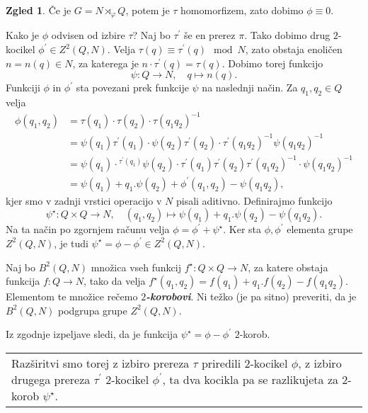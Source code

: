 \documentclass[11pt]{book}
\def\definicija{\color{rdeca}\bf\em}
\def\vprasanje{\color{oranzna}}
\theoremstyle{definition}
\theoremstyle{zgled}
\newtheorem*{zgled}{Zgled}
\theoremstyle{odprtproblem}
\theoremstyle{domacanaloga}
\theoremstyle{izrek}
\newenvironment{povzetek}
    {
\smallskip
\begin{center}
\color{svetlosiva}
\begin{tabular}{|p{0.7\textwidth}}
    }
    {
\end{tabular}
\end{center}
\smallskip
    }
\begin{document}
\begin{zgled}
Če je $G = N \rtimes_\varphi Q$, potem je $\tau$ homomorfizem, zato dobimo $\phi \equiv 0$.
\end{zgled}

{\vprasanje Kako je $\phi$ odvisen od izbire $\tau$?} Naj bo $\tau^\prime$ še en prerez $\pi$. Tako dobimo drug $2$-kocikel $\phi^\prime \in Z^2(Q,N)$. Velja $\tau(q) \equiv \tau^\prime(q) \mod{N}$, zato obstaja enoličen $n = n(q) \in N$, za katerega je $n \cdot \tau^\prime(q) = \tau(q)$. Dobimo torej funkcijo 
\[
\psi \colon Q \to N, \quad q \mapsto n(q).
\]
Funkciji $\phi$ in $\phi^\prime$ sta povezani prek funkcije $\psi$ na naslednji način. Za $q_1, q_2 \in Q$ velja
\begin{align*}
\phi(q_1, q_2) &= \tau(q_1) \cdot \tau(q_2) \cdot \tau(q_1 q_2)^{-1} \\
&= \psi(q_1) \tau^\prime(q_1) \cdot \psi(q_2) \tau^\prime(q_2) \cdot \tau^\prime(q_1 q_2)^{-1} \psi(q_1 q_2)^{-1} \\
&= \psi(q_1) \cdot {}^{\tau^\prime(q_1)}\psi(q_2) \cdot \tau^\prime(q_1) \tau^\prime(q_2) \tau^\prime(q_1 q_2)^{-1} \cdot \psi(q_1 q_2)^{-1} \\
&= \psi(q_1) + q_1.\psi(q_2) + \phi^\prime(q_1, q_2) - \psi(q_1 q_2),
\end{align*}
kjer smo v zadnji vrstici operacijo v $N$ pisali aditivno. Definirajmo funkcijo
\[
\psi^\star \colon Q \times Q \to N, \quad
(q_1, q_2) \mapsto \psi(q_1) + q_1.\psi(q_2) - \psi(q_1 q_2).
\]
Na ta način po zgornjem računu velja $\phi = \phi^\prime + \psi^\star$. Ker sta $\phi, \phi^\prime$ elementa grupe $Z^2(Q,N)$, je tudi $\psi^\star = \phi - \phi^\prime \in Z^2(Q,N)$.

Naj bo {\definicija $B^2(Q,N)$} množica vseh funkcij $f^\star \colon Q \times Q \to N$, za katere obstaja funkcija $f \colon Q \to N$, tako da velja $f^\star(q_1, q_2) = f(q_1) + q_1.f(q_2) - f(q_1 q_2)$. Elementom te množice rečemo {\definicija $2$-korobovi}. Ni težko (je pa sitno) preveriti, da je $B^2(Q,N)$ podgrupa grupe $Z^2(Q,N)$.

Iz zgodnje izpeljave sledi, da je funkcija $\psi^\star = \phi - \phi^\prime$ $2$-korob. 

\begin{povzetek}
Razširitvi smo torej z izbiro prereza $\tau$ priredili $2$-kocikel $\phi$, z izbiro drugega prereza $\tau^\prime$ $2$-kocikel $\phi^\prime$, ta dva kocikla pa se razlikujeta za $2$-korob $\psi^\star$.
\end{povzetek}
\end{document}

